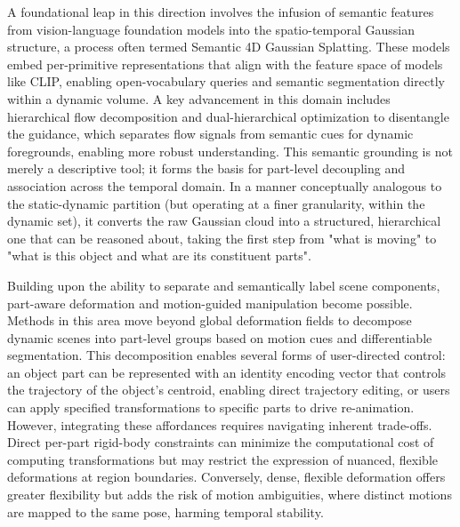 \documentclass[11pt,a4paper]{article}
\begin{document}
A foundational leap in this direction involves the infusion of semantic features from vision-language foundation models into the spatio-temporal Gaussian structure, a process often termed Semantic 4D Gaussian Splatting. These models embed per-primitive representations that align with the feature space of models like CLIP, enabling open-vocabulary queries and semantic segmentation directly within a dynamic volume. A key advancement in this domain includes hierarchical flow decomposition and dual-hierarchical optimization to disentangle the guidance, which separates flow signals from semantic cues for dynamic foregrounds, enabling more robust understanding. This semantic grounding is not merely a descriptive tool; it forms the basis for part-level decoupling and association across the temporal domain. In a manner conceptually analogous to the static-dynamic partition (but operating at a finer granularity, within the dynamic set), it converts the raw Gaussian cloud into a structured, hierarchical one that can be reasoned about, taking the first step from "what is moving" to "what is this object and what are its constituent parts".

Building upon the ability to separate and semantically label scene components, part-aware deformation and motion-guided manipulation become possible. Methods in this area move beyond global deformation fields to decompose dynamic scenes into part-level groups based on motion cues and differentiable segmentation. This decomposition enables several forms of user-directed control: an object part can be represented with an identity encoding vector that controls the trajectory of the object's centroid, enabling direct trajectory editing, or users can apply specified transformations to specific parts to drive re-animation. However, integrating these affordances requires navigating inherent trade-offs. Direct per-part rigid-body constraints can minimize the computational cost of computing transformations but may restrict the expression of nuanced, flexible deformations at region boundaries. Conversely, dense, flexible deformation offers greater flexibility but adds the risk of motion ambiguities, where distinct motions are mapped to the same pose, harming temporal stability. 
\end{document}
